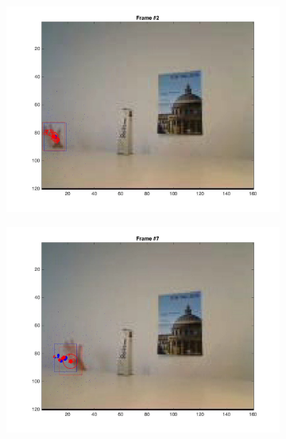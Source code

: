 \documentclass{ethz_report}
\begin{document}
\begin{figure}[h]
    \centering
    \begin{subfigure}[b]{.25\textwidth}
        \centering
        \includegraphics[width=1\linewidth]{images/video2_observe_low_1}
    \end{subfigure}%
    \begin{subfigure}[b]{.25\textwidth}
        \centering
        \includegraphics[width=1\linewidth]{images/video2_observe_low_6}
    \end{subfigure}%
    \begin{subfigure}[b]{.25\textwidth}
        \centering

\end{subfigure}
\end{figure}
\end{document}
